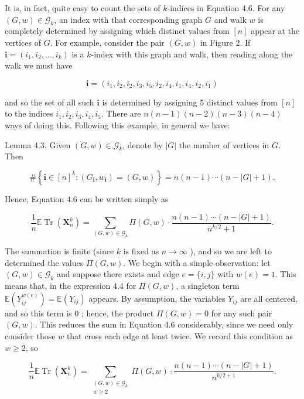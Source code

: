 \documentclass[10pt]{article}
\begin{document}
It is, in fact, quite easy to count the sets of $k$-indices in Equation 4.6. For any $(G, w) \in \mathcal{G}_{k}$, an index with that corresponding graph $G$ and walk $w$ is completely determined by assigning which distinct values from $[n]$ appear at the vertices of $G$. For example, consider the pair $(G, w)$ in Figure 2. If $\mathbf{i}=\left(i_{1}, i_{2}, \ldots, i_{k}\right)$ is a $k$-index with this graph and walk, then reading along the walk we must have

$$
\mathbf{i}=\left(i_{1}, i_{2}, i_{2}, i_{3}, i_{5}, i_{2}, i_{4}, i_{1}, i_{4}, i_{2}, i_{1}\right)
$$

and so the set of all such $\mathbf{i}$ is determined by assigning 5 distinct values from $[n]$ to the indices $i_{1}, i_{2}, i_{3}, i_{4}, i_{5}$. There are $n(n-1)(n-2)(n-3)(n-4)$ ways of doing this. Following this example, in general we have:

Lemma 4.3. Given $(G, w) \in \mathcal{G}_{k}$, denote by $|G|$ the number of vertices in $G$. Then

$$
\#\left\{\mathbf{i} \in[n]^{k}:\left(G_{\mathbf{i}}, w_{\mathbf{i}}\right)=(G, w)\right\}=n(n-1) \cdots(n-|G|+1) .
$$

Hence, Equation 4.6 can be written simply as


\begin{equation*}
\frac{1}{n} \mathbb{E} \operatorname{Tr}\left(\mathbf{X}_{n}^{k}\right)=\sum_{(G, w) \in \mathcal{G}_{k}} \Pi(G, w) \cdot \frac{n(n-1) \cdots(n-|G|+1)}{n^{k / 2}+1} . \tag{4.7}
\end{equation*}


The summation is finite (since $k$ is fixed as $n \rightarrow \infty$ ), and so we are left to determined the values $\Pi(G, w)$. We begin with a simple observation: let $(G, w) \in \mathcal{G}_{k}$ and suppose there exists and edge $e=\{i, j\}$ with $w(e)=1$. This means that, in the expression 4.4 for $\Pi(G, w)$, a singleton term $\mathbb{E}\left(Y_{i j}^{w(e)}\right)=\mathbb{E}\left(Y_{i j}\right)$ appears. By assumption, the variables $Y_{i j}$ are all centered, and so this term is 0 ; hence, the product $\Pi(G, w)=0$ for any such pair $(G, w)$. This reduces the sum in Equation 4.6 considerably, since we need only consider those $w$ that cross each edge at least twice. We record this condition as $w \geq 2$, so


\begin{equation*}
\frac{1}{n} \mathbb{E} \operatorname{Tr}\left(\mathbf{X}_{n}^{k}\right)=\sum_{\substack{(G, w) \in \mathcal{G}_{k} \\ w \geq 2}} \Pi(G, w) \cdot \frac{n(n-1) \cdots(n-|G|+1)}{n^{k / 2+1}} . \tag{4.8}
\end{equation*}
\end{document}
